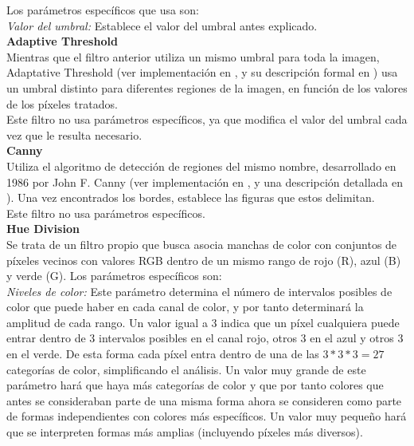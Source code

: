 		Los parámetros específicos que usa son:\\		
		
		\noindent\textit{Valor del umbral:} Establece el valor del umbral antes explicado.\\
		
	\noindent\textbf{Adaptive Threshold}\\

		Mientras que el filtro anterior utiliza un mismo umbral para toda la imagen, Adaptative Threshold (ver implementación en \cite{opencvDoc}, y su descripción formal en \cite{pajares}) usa un umbral distinto para diferentes regiones de la imagen, en función de los valores de los píxeles tratados.\\ 
		
		Este filtro no usa parámetros específicos, ya que modifica el valor del umbral cada vez que le resulta necesario.\\
		
	\noindent\textbf{Canny}\\

		Utiliza el algoritmo de detección de regiones del mismo nombre, desarrollado en 1986 por John F. Canny (ver implementación en \cite{opencvDoc}, y una descripción detallada en \cite{pajares}). Una vez encontrados los bordes, establece las figuras que estos delimitan.\\
		
		Este filtro no usa parámetros específicos.\\
		
	\noindent\textbf{Hue Division}\\


		Se trata de un filtro propio que busca asocia manchas de color con conjuntos de píxeles vecinos con valores RGB dentro de un mismo rango de rojo (R), azul (B) y verde (G). Los parámetros específicos son:\\
		
		\noindent\textit{Niveles de color:} Este parámetro determina el número de intervalos posibles de color que puede haber en cada canal de color, y por tanto determinará la amplitud de cada rango. Un valor igual a 3 indica que un píxel cualquiera puede entrar dentro de 3 intervalos posibles en el canal rojo, otros 3 en el azul y otros 3 en el verde. De esta forma cada píxel entra dentro de una de las $3*3*3=27$ categorías de color, simplificando el análisis. Un valor muy grande de este parámetro hará que haya más categorías de color y que por tanto colores que antes se consideraban parte de una misma forma ahora se consideren como parte de formas independientes con colores más específicos. Un valor muy pequeño hará que se interpreten formas más amplias (incluyendo píxeles más diversos).\\
		
